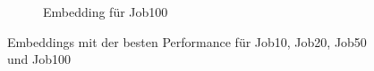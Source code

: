 \begin{figure}[H]
\begin{subfigure}[b]{0.4\textwidth}
            \caption[]%
            {{\small Embedding für Job100}}    
            \label{fig:EmbeddingJob100}
        \end{subfigure}
        \caption[ Ergebnisse nach Komplexität ]
         {\small Embeddings mit der besten Performance für Job10, Job20, Job50 und Job100} 
        \label{fig:B}
    \end{figure}



